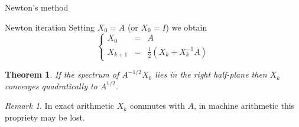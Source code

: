 \documentclass{beamer}
\newcounter{counter1}
\theoremstyle{plain}
\newtheorem{myteo}[counter1]{Theorem}
\theoremstyle{definition}
\theoremstyle{remark}
\newtheorem{myoss}[counter1]{Remark}
\newcommand{\pa}[1]{\left(#1\right)}
\newcommand{\norm}[1]{\left\|#1\right\|}
\DeclareMathOperator{\sign}{sign}
\begin{document}
\begin{frame}{Newton's method}
  \begin{block}{Newton iteration}
    Setting $X_0 = A$ (or $X_0 = I$) we obtain
    \[ \left\{
        \begin{matrix}
          X_0 &=& A \\
          X_{k+1} &=& \frac{1}{2} \pa{ X_k + X_k ^{-1} A}
        \end{matrix} \right.
    \]
  \end{block}

  \begin{myteo}
    If the spectrum  of $A^{-1/2} X_0$ lies in the right half-plane
    then $X_k$ converges quadratically to $A^{1/2}$.
  \end{myteo}
  \begin{myoss}
    In exact arithmetic $X_k$ commutes with $A$, in machine arithmetic
    this propriety may be lost.
  \end{myoss}
\end{frame}




  
\end{document}
